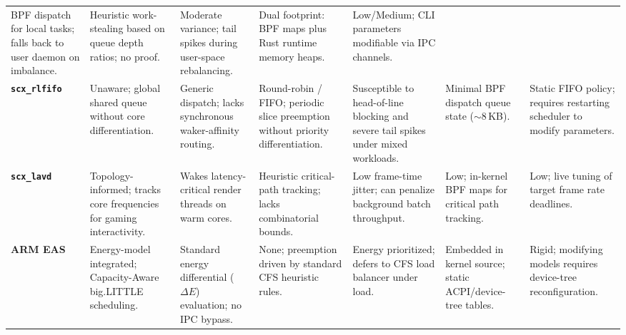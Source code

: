 \documentclass[letterpaper,twocolumn,10pt]{article}
\begin{document}
\begin{table}[t]
\begin{tabularx}{\textwidth}{l X X X X X X}
BPF dispatch for local tasks; falls back to user daemon on imbalance. & 
Heuristic work-stealing based on queue depth ratios; no proof. & 
Moderate variance; tail spikes during user-space rebalancing. & 
Dual footprint: BPF maps plus Rust runtime memory heaps. & 
Low/Medium; CLI parameters modifiable via IPC channels. \\
\textbf{\texttt{scx\_rlfifo}} \newline \cite{scx_repo} & 
Unaware; global shared queue without core differentiation. & 
Generic dispatch; lacks synchronous waker-affinity routing. & 
Round-robin / FIFO; periodic slice preemption without priority differentiation. & 
Susceptible to head-of-line blocking and severe tail spikes under mixed workloads. & 
Minimal BPF dispatch queue state ($\sim$8\,KB). & 
Static FIFO policy; requires restarting scheduler to modify parameters. \\
\textbf{\texttt{scx\_lavd}} \newline \cite{min2024scxlavd} & 
Topology-informed; tracks core frequencies for gaming interactivity. & 
Wakes latency-critical render threads on warm cores. & 
Heuristic critical-path tracking; lacks combinatorial bounds. & 
Low frame-time jitter; can penalize background batch throughput. & 
Low; in-kernel BPF maps for critical path tracking. & 
Low; live tuning of target frame rate deadlines. \\
\textbf{ARM EAS} \newline \cite{rasmussen2018eas} & 
Energy-model integrated; Capacity-Aware big.LITTLE scheduling. & 
Standard energy differential ($\Delta E$) evaluation; no IPC bypass. & 
None; preemption driven by standard CFS heuristic rules. & 
Energy prioritized; defers to CFS load balancer under load. & 
Embedded in kernel source; static ACPI/device-tree tables. & 
Rigid; modifying models requires device-tree reconfiguration. \\
\bottomrule
\end{tabularx}
\end{table}
\end{document}

